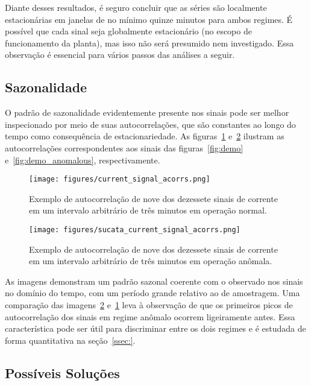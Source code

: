 Diante desses resultados, é seguro concluir que as séries são localmente
estacionárias em janelas de no mínimo quinze minutos para ambos regimes. É
possível que cada sinal seja globalmente estacionário (no escopo de
funcionamento da planta), mas isso não será presumido nem investigado.
Essa observação é essencial para vários passos das análises a seguir.

\subsection{Sazonalidade}

O padrão de sazonalidade evidentemente presente nos sinais pode ser melhor
inspecionado por meio de suas autocorrelações, que são constantes ao longo do
tempo como consequência de estacionariedade. As figuras~\ref{fig:demo_acorrs}
e~\ref{fig:anomalous_demo_acorrs} ilustram as autocorrelações correspondentes
aos sinais das figuras~\ref{fig:demo} e~\ref{fig:demo_anomalous},
respectivamente.

\begin{figure}[H]
    \centering
    \texttt{[image: figures/current\_signal\_acorrs.png]}
    \caption{Exemplo de autocorrelação de nove dos dezessete sinais de corrente
    em um intervalo arbitrário de três minutos em operação normal.}
    \label{fig:demo_acorrs}
\end{figure}

\begin{figure}[H]
    \centering
    \texttt{[image: figures/sucata\_current\_signal\_acorrs.png]}
    \caption{Exemplo de autocorrelação de nove dos dezessete sinais de corrente
    em um intervalo arbitrário de três minutos em operação anômala.}
    \label{fig:anomalous_demo_acorrs}
\end{figure}

As imagens demonstram um padrão sazonal coerente com o observado nos sinais no
domínio do tempo, com um período grande relativo ao de amostragem. Uma
comparação das imagens~\ref{fig:anomalous_demo_acorrs} e~\ref{fig:demo_acorrs}
leva à observação de que os primeiros picos de autocorrelação dos sinais em
regime anômalo ocorrem ligeiramente antes. Essa característica pode ser útil
para discriminar entre os dois regimes e é estudada de forma quantitativa
na seção~\ref{ssec:}.

\subsection{Possíveis Soluções}

